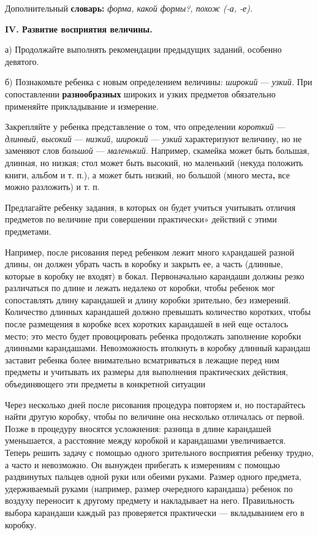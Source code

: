 \documentclass{book}
\renewcommand{\emph}[1]{\textit{#1}}
\begin{document}
Дополнительный \textbf{словарь:} \emph{форма, какой формы?, похож (-а,
-е).}

\textbf{IV. Развитие восприятия величины.}

а) Продолжайте выполнять рекомендации предыдущих заданий, особенно
девятого.

б) Познакомьте ребенка с новым определением величины: \emph{широкий} ---
\emph{узкий.} При сопоставлении \textbf{разнообразных} широких и узких
предметов обязательно применяйте прикладывание и измерение.

Закрепляйте у ребенка представление о том, что определении
\emph{короткий} --- \emph{длинный, высокий} --- \emph{низкий, широкий}
--- \emph{узкий} характеризуют величину, но не заменяют слов
\emph{большой} --- \emph{маленький.} Например, скамейка может быть
большая, длинная, но низкая; стол может быть высокий, но маленький
(некуда положить книги, альбом и т. п.), а может быть низкий, но большой
(много места\textbf{,} все можно разложить) и т. п.

Предлагайте ребенку задания, в которых он будет учиться учитывать
отличия предметов по величине при совершении практически» действий с
этими предметами.

Например, после рисования перед ребенком лежит много \textsc{ка}рандашей
разной длины, он должен убрать часть в коробку и закрыть ее, а часть
(длинные, которые в коробку не входят) в бокал. Первоначально карандаши
должны резко различаться по длине и лежать недалеко от коробки, чтобы
ребенок мог сопоставлять длину карандашей и длину коробки зрительно, без
измерений. Количество длинных карандашей должно превышать количество
коротких, чтобы после размещения в коробке всех коротких карандашей в
ней еще осталось место; это место будет провоцировать ребенка продолжать
заполнение коробки длинными карандашами. Невозможность втолкнуть в
коробку длинный карандаш заставит ребенка более внимательно
всматриваться в лежащие перед ним предметы и учитывать их размеры для
выполнения практических действия, объединяющего эти предметы в
конкретной ситуации

Через несколько дней после рисования процедура повторяем и, но
постарайтесь найти другую коробку, чтобы по величине она несколько
отличалась от первой. Позже в процедуру вносятся усложнения: разница в
длине карандашей уменьшается, а расстояние между коробкой и карандашами
увеличивается. Теперь решить задачу с помощью одного зрительного
восприятия ребенку трудно, а часто и невозможно. Он вынужден прибегать к
измерениям с помощью раздвинутых пальцев одной руки или обеими руками.
Размер одного предмета, удерживаемый руками (например, размер очередного
карандаша) ребенок по воздуху переносит к другому предмету и накладывает
на него. Правильность выбора карандаши каждый раз проверяется
практически --- вкладыванием его в коробку.
\end{document}

